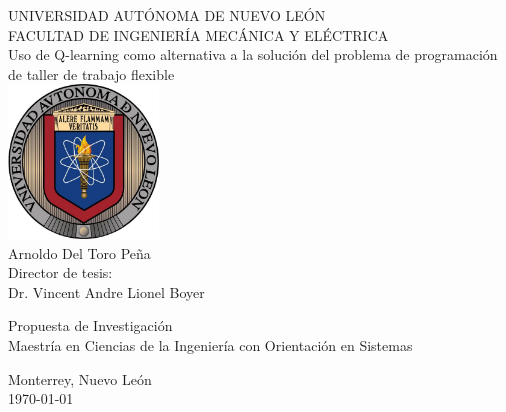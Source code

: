 \documentclass[letterpaper, 10 pt]{article}
\newcommand{\Tittle}[1]{ {\LARGE  #1 }  }
\newcommand{\subTittle}[1]{ {\Large  #1 }  }
\begin{document}
\sffamily %

\begin{titlepage}
	\begin{center}
		\vspace*{1cm}
		
		\Tittle{UNIVERSIDAD AUTÓNOMA DE NUEVO LEÓN} \\
			\vspace{1.5 cm}
		\Tittle{FACULTAD DE INGENIERÍA MECÁNICA Y ELÉCTRICA} \\ 
		\vspace{1cm}
		{\LARGE Uso de Q-learning como alternativa a la solución del problema de programación de taller de trabajo flexible}
		\\
			\vspace{2.5 cm}
		\includegraphics[width=0.3\textwidth]{uanl}
		 \\
		\vspace{1cm}
		\subTittle{Arnoldo Del Toro Peña}  \vspace{0.25 cm} \\ 
		\subTittle{Director de tesis:} \vspace{0.25 cm} \\
		\subTittle{Dr. Vincent Andre Lionel Boyer} 
		
		
		
		\vfill
		
		{\LARGE  Propuesta de Investigación\\
		Maestría en Ciencias de la Ingeniería con Orientación en Sistemas}
		
		\vspace{0.8cm}
		
		
		
		Monterrey, Nuevo León \\
		\today
		
	\end{center}
\end{titlepage}

\pagestyle{empty}
\tableofcontents

%
%
%
%
%
%
%
\end{document}
